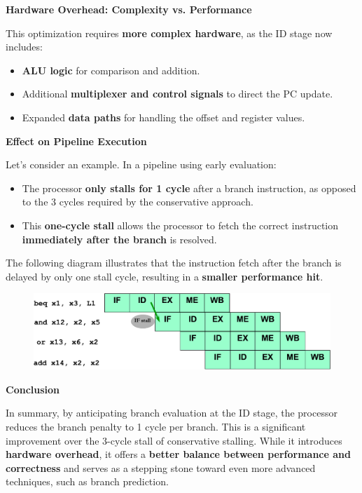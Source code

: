 \highspace
\begin{flushleft}
	\textcolor{Red2}{ \textbf{Hardware Overhead: Complexity vs. Performance}}
\end{flushleft}
This optimization requires \textbf{more complex hardware}, as the ID stage now includes:
\begin{itemize}
	\item \textbf{ALU logic} for comparison and addition.
	\item Additional \textbf{multiplexer and control signals} to direct the PC update.
	\item Expanded \textbf{data paths} for handling the offset and register values.
\end{itemize}

\newpage

\begin{flushleft}
	\textcolor{Green3}{ \textbf{Effect on Pipeline Execution}}
\end{flushleft}
Let’s consider an example. In a pipeline using early evaluation:
\begin{itemize}
	\item The processor \textbf{only stalls for 1 cycle} after a branch instruction, as opposed to the 3 cycles required by the conservative approach.
	\item This \textbf{one-cycle stall} allows the processor to fetch the correct instruction \textbf{immediately after the branch} is resolved.
\end{itemize}
The following diagram illustrates that the instruction fetch after the branch is delayed by only one stall cycle, resulting in a \textcolor{Green3}{\textbf{smaller performance hit}}.

\begin{figure}[!htp]
	\centering
	\includegraphics[width=\textwidth]{img/early-branch-evaluation.pdf}
\end{figure}

\highspace
\begin{flushleft}
	\textcolor{Green3}{ \textbf{Conclusion}}
\end{flushleft}
In summary, by anticipating branch evaluation at the ID stage, the processor reduces the branch penalty to 1 cycle per branch. This is a significant improvement over the 3-cycle stall of conservative stalling. While it introduces \textbf{hardware overhead}, it offers a \textbf{better balance between performance and correctness} and serves as a stepping stone toward even more advanced techniques, such as branch prediction.